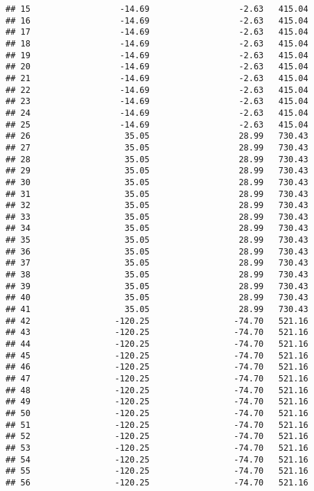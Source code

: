 \documentclass[]{article}
\begin{document}
\begin{verbatim}
## 15                  -14.69                  -2.63   415.04
## 16                  -14.69                  -2.63   415.04
## 17                  -14.69                  -2.63   415.04
## 18                  -14.69                  -2.63   415.04
## 19                  -14.69                  -2.63   415.04
## 20                  -14.69                  -2.63   415.04
## 21                  -14.69                  -2.63   415.04
## 22                  -14.69                  -2.63   415.04
## 23                  -14.69                  -2.63   415.04
## 24                  -14.69                  -2.63   415.04
## 25                  -14.69                  -2.63   415.04
## 26                   35.05                  28.99   730.43
## 27                   35.05                  28.99   730.43
## 28                   35.05                  28.99   730.43
## 29                   35.05                  28.99   730.43
## 30                   35.05                  28.99   730.43
## 31                   35.05                  28.99   730.43
## 32                   35.05                  28.99   730.43
## 33                   35.05                  28.99   730.43
## 34                   35.05                  28.99   730.43
## 35                   35.05                  28.99   730.43
## 36                   35.05                  28.99   730.43
## 37                   35.05                  28.99   730.43
## 38                   35.05                  28.99   730.43
## 39                   35.05                  28.99   730.43
## 40                   35.05                  28.99   730.43
## 41                   35.05                  28.99   730.43
## 42                 -120.25                 -74.70   521.16
## 43                 -120.25                 -74.70   521.16
## 44                 -120.25                 -74.70   521.16
## 45                 -120.25                 -74.70   521.16
## 46                 -120.25                 -74.70   521.16
## 47                 -120.25                 -74.70   521.16
## 48                 -120.25                 -74.70   521.16
## 49                 -120.25                 -74.70   521.16
## 50                 -120.25                 -74.70   521.16
## 51                 -120.25                 -74.70   521.16
## 52                 -120.25                 -74.70   521.16
## 53                 -120.25                 -74.70   521.16
## 54                 -120.25                 -74.70   521.16
## 55                 -120.25                 -74.70   521.16
## 56                 -120.25                 -74.70   521.16

\end{verbatim}
\end{document}
